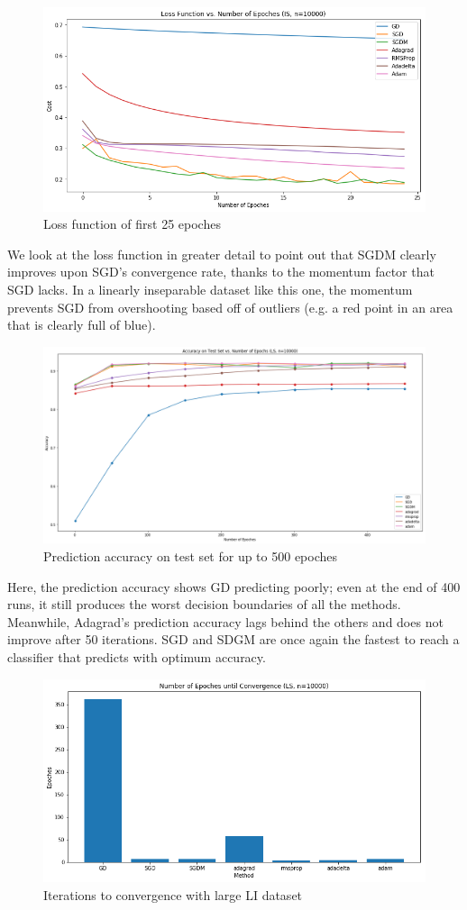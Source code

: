 \documentclass[twoside,11pt]{homework}
\begin{document}
	\begin{figure}[H]
		\centering
		\includegraphics[scale=.5]{q5/insep_10000/loss_n25.png}	
		\caption{Loss function of first 25 epoches}
	\end{figure}

We look at the loss function in greater detail to point out that SGDM clearly improves upon SGD's convergence rate, thanks to the momentum factor that SGD lacks. In a linearly inseparable dataset like this one, the momentum prevents SGD from overshooting based off of outliers (e.g. a red point in an area that is clearly full of blue).
	
	\begin{figure}[H]
		\centering
		\includegraphics[scale=.3]{q5/insep_10000/acc_500.png}	
		\caption{Prediction accuracy on test set for up to 500 epoches}
	\end{figure}

Here, the prediction accuracy shows GD predicting poorly; even at the end of 400 runs, it still produces the worst decision boundaries of all the methods. Meanwhile, Adagrad's prediction accuracy lags behind the others and does not improve after 50 iterations. SGD and SDGM are once again the fastest to reach a classifier that predicts with optimum accuracy.

\begin{figure}[H]
		\centering
		\includegraphics[scale=.5]{q5/insep_10000/time.png}	
		\caption{Iterations to convergence with large LI dataset}
	\end{figure}
	
\end{document}
